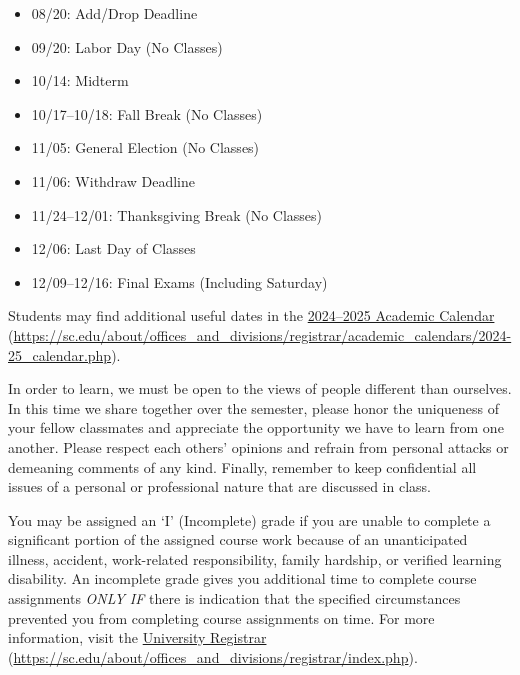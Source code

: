 \documentclass[11pt,letterpaper]{article}
\begin{document}
	\begin{itemize}
	\item 08/20: Add/Drop Deadline
	\item 09/20: Labor Day (No Classes)
	\item 10/14: Midterm
	\item 10/17--10/18: Fall Break (No Classes)
	\item 11/05: General Election (No Classes)
	\item 11/06: Withdraw Deadline
	\item 11/24--12/01: Thanksgiving Break (No Classes)
	\item 12/06: Last Day of Classes
	\item 12/09--12/16: Final Exams (Including Saturday)
	\end{itemize}

Students may find additional useful dates in the \href{https://sc.edu/about/offices\_and\_divisions/registrar/academic\_calendars/2024-25\_calendar.php}{2024--2025 Academic Calendar} (\url{https://sc.edu/about/offices\_and\_divisions/registrar/academic\_calendars/2024-25\_calendar.php}). \sectionbreak




In order to learn, we must be open to the views of people different than ourselves. In this time we share together over the semester, please honor the uniqueness of your fellow classmates and appreciate the opportunity we have to learn from one another. Please respect each others' opinions and refrain from personal attacks or demeaning comments of any kind. Finally, remember to keep confidential all issues of a personal or professional nature that are discussed in class. \sectionbreak




You may be assigned an `I' (Incomplete) grade if you are unable to complete a significant portion of the assigned course work because of an unanticipated illness, accident, work-related responsibility, family hardship, or verified learning disability. An incomplete grade gives you additional time to complete course assignments {\itshape ONLY IF} there is indication that the specified circumstances prevented you from completing course assignments on time. For more information, visit the \href{https://sc.edu/about/offices\_and\_divisions/registrar/index.php}{University Registrar} (\url{https://sc.edu/about/offices\_and\_divisions/registrar/index.php}). \sectionbreak
\end{document}
